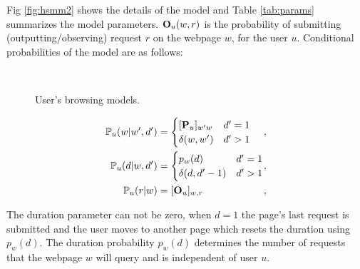 	Fig \ref{fig:hsmm2} shows the details of the model and Table \ref{tab:params} summarizes the model parameters.
	$\mathbf{O}_u(w, r)$  is the probability of submitting (outputting/observing) request $r$ on the webpage $w$, for the user $u$.	
	Conditional probabilities of the model are as follows:	
	\begin{figure}
	\centering
	~
	~
	\caption{User's browsing models.}
	\label{fig:hsmm}
\end{figure}	
	
	
	
	\begin{equation}
	\label{eq:probs}
	\begin{alignedat}{3}
	\pr_u(w | w', d') &= 
	\begin{cases} 
	[\bP_u]_{w'w} & d' = 1  \\
	\delta(w, w') & d' > 1
	\end{cases} &,&
	\\ 
	\pr_u(d | w, d') &= 
	\begin{cases} 
	p_{w}(d) & d' = 1 \\
	\delta(d, d'-1) & d' > 1
	\end{cases} &,&
	\\   
	\pr_u(r|w) &= [\O_{u}]_{w, r}&,&	
	\end{alignedat} 
	\end{equation}
	
	The duration parameter can not be zero, when $d = 1$ the page's last request is submitted and the user moves to another page which resets the duration using $p_w(d)$. 
	The duration probability $p_w(d)$ determines the number of requests that the webpage $w$ will query and is independent of user $u$. 
	
